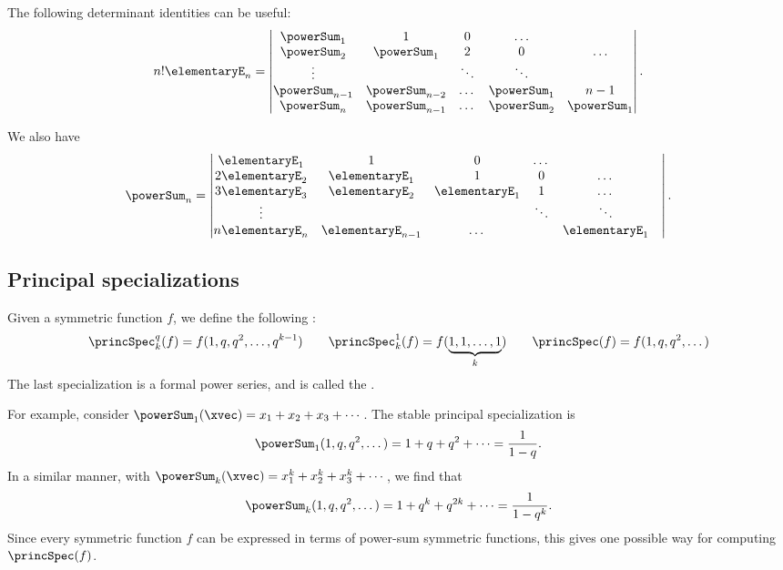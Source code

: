 The following determinant identities can be useful:
\[
n! \elementaryE_n = \begin{vmatrix}
\powerSum_1 & 1 & 0 & \dotsc \\
\powerSum_2 & \powerSum_1 & 2 & 0 & \dotsc  \\
\vdots && \ddots & \ddots \\
\powerSum_{n-1} & \powerSum_{n-2} & \dotsc & \powerSum_1 & n-1 \\
\powerSum_n & \powerSum_{n-1} & \dotsc & \powerSum_2 & \powerSum_1
\end{vmatrix}.
\]

We also have
\[
\powerSum_n =
\begin{vmatrix}
\elementaryE_1 & 1 & 0 & \dotsc & \\
2\elementaryE_2 & \elementaryE_1 & 1 & 0 & \dotsc & \\
3\elementaryE_3 & \elementaryE_2 & \elementaryE_1 & 1 & \dotsc & \\
\vdots &&& \ddots & \ddots  & \\
n\elementaryE_n & \elementaryE_{n-1} & \dotsc & & \elementaryE_1 &
\end{vmatrix}.
\]



\subsection[standardSpecialization]{Principal specializations}

Given a symmetric function $f$, we define the following
\label{principalSpecialization}:
\[
\princSpec_k^q(f) = f(1,q,q^2,\dotsc,q^{k-1})
\qquad
\princSpec_k^1(f) = f(\underbrace{1,1,\dotsc,1}_k)
\qquad
\princSpec(f) = f(1,q,q^2,\dotsc)
\]
The last specialization is a formal power series,
and is called the \label{stablePrincipalSpecialization}.

\begin{example*}
For example, consider $\powerSum_1(\xvec)=x_1+x_2+x_3+\dotsb$.
The stable principal specialization is
\[
\powerSum_1(1,q,q^2,\dotsc) = 1+q+q^2+\dotsb = \frac{1}{1-q}.
\]
In a similar manner, with $\powerSum_k(\xvec)=x_1^k + x_2^k + x_3^k + \dotsb$, we find that
\[
\powerSum_k(1,q,q^2,\dotsc) = 1+q^k+q^{2k}+\dotsb = \frac{1}{1-q^k}.
\]
Since every symmetric function $f$ can be expressed in terms of power-sum symmetric functions,
this gives one possible way for computing $\princSpec(f)$.
\end{example*}

